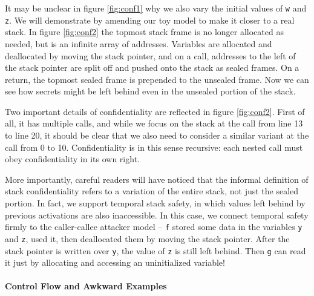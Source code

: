 \documentclass[acmsmall,review,anonymous]{acmart}\settopmatter{printfolios=true,printccs=false,printacmref=false}
\begin{document}
It may be unclear in figure \ref{fig:conf1} why we also vary the initial values of {\tt w}
and {\tt z}. We will demonstrate by amending our toy model to make it closer to a real stack.
In figure \ref{fig:conf2} the topmost stack frame is no longer allocated as needed, but is an
infinite array of addresses. Variables are allocated and deallocated by moving the stack pointer,
and on a call, addresses to the left of the stack pointer are split off and pushed onto the
stack as sealed frames. On a return, the topmost sealed frame is prepended to the unsealed
frame. Now we can see how secrets might be left behind even in the unsealed portion of the stack.


Two important details of confidentiality are reflected in figure \ref{fig:conf2}.
First of all, it has multiple calls, and while we focus on the stack at the call
from line 13 to line 20, it should be clear that we also need to consider a similar
variant at the call from 0 to 10. Confidentiality is in this sense recursive: each
nested call must obey confidentiality in its own right.

More importantly, careful readers will have noticed that the informal definition
of stack confidentiality refers to a variation of the entire stack, not just the
sealed portion. In fact, we support temporal stack safety, in which values left behind
by previous activations are also inaccessible. In this case, we connect temporal safety
firmly to the caller-callee attacker model -- {\tt f} stored some data in the variables
{\tt y} and {\tt z}, used it, then deallocated them by moving the stack pointer.
After the stack pointer is written over {\tt y}, the value of {\tt z} is still
left behind. Then {\tt g} can read it just by allocating and accessing an uninitialized
variable! 

\paragraph*{Control Flow and Awkward Examples}
\end{document}
